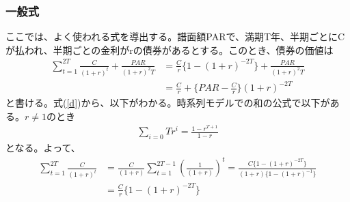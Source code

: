 \documentclass[a4j,12pt]{jarticle}
\begin{document}
\subsubsection{一般式}
ここでは、よく使われる式を導出する。譜面額PARで、満期T年、半期ごとにCが払われ、半期ごとの金利がrの債券があるとする。このとき、債券の価値は
\begin{align}
\label{d}
\sum_{t = 1}^{2T}\frac{C}{(1+r)^t} + \frac{PAR}{(1+r)^2T} &= \frac{C}{r}\{1-(1+r)^{-2T}\} + \frac{PAR}{(1+r)^2T} \nonumber \\
&=  \frac{C}{r} + \{PAR - \frac{C}{r}\}(1+r)^{-2T}
\end{align}
と書ける。式(\ref{d})から、以下がわかる。時系列モデルでの和の公式で以下がある。$r \neq 1$のとき
\begin{align}
\sum_{i = 0}{T}r^{i} = \frac{1 - r^{T+1}}{1-r}
\end{align}
となる。よって、
\begin{align}
\sum_{t = 1}^{2T}\frac{C}{(1+r)^t} &= \frac{C}{(1+r)}\sum_{t = 1}^{2T-1}\left(\frac{1}{(1+r)}\right)^{t} = \frac{C\{1 - (1+r)^{-2T}\}}{(1+r)\{1 - (1+r)^{-1}\}} \nonumber \\
&= \frac{C}{r}\{1 - (1+r)^{-2T}\}
\end{align}
\end{document}
